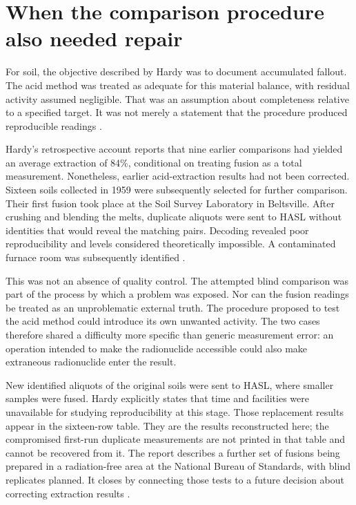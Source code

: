 \documentclass[11pt,a4paper]{article}
\begin{document}
\section{When the comparison procedure also needed repair}
For soil, the objective described by Hardy was to document accumulated fallout. The acid method was treated as adequate for this material balance, with residual activity assumed negligible. That was an assumption about completeness relative to a specified target. It was not merely a statement that the procedure produced reproducible readings \citep[p.~97]{hardysoil}.

Hardy's retrospective account reports that nine earlier comparisons had yielded an average extraction of 84\%, conditional on treating fusion as a total measurement. Nonetheless, earlier acid-extraction results had not been corrected. Sixteen soils collected in 1959 were subsequently selected for further comparison. Their first fusion took place at the Soil Survey Laboratory in Beltsville. After crushing and blending the melts, duplicate aliquots were sent to HASL without identities that would reveal the matching pairs. Decoding revealed poor reproducibility and levels considered theoretically impossible. A contaminated furnace room was subsequently identified \citep[p.~97]{hardysoil}.

This was not an absence of quality control. The attempted blind comparison was part of the process by which a problem was exposed. Nor can the fusion readings be treated as an unproblematic external truth. The procedure proposed to test the acid method could introduce its own unwanted activity. The two cases therefore shared a difficulty more specific than generic measurement error: an operation intended to make the radionuclide accessible could also make extraneous radionuclide enter the result.

New identified aliquots of the original soils were sent to HASL, where smaller samples were fused. Hardy explicitly states that time and facilities were unavailable for studying reproducibility at this stage. Those replacement results appear in the sixteen-row table. They are the results reconstructed here; the compromised first-run duplicate measurements are not printed in that table and cannot be recovered from it. The report describes a further set of fusions being prepared in a radiation-free area at the National Bureau of Standards, with blind replicates planned. It closes by connecting those tests to a future decision about correcting extraction results \citep[pp.~97--98]{hardysoil}.
\end{document}
